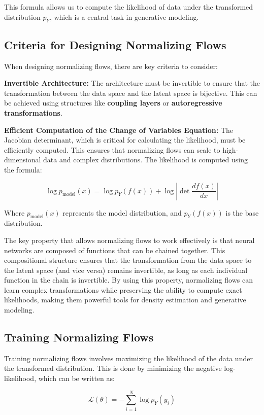 \documentclass{article}
\begin{document}
This formula allows us to compute the likelihood of data under the transformed distribution \( p_Y \), which is a central task in generative modeling.

\subsection{Criteria for Designing Normalizing Flows}
When designing normalizing flows, there are key criteria to consider:


\textbf{Invertible Architecture:} The architecture must be invertible to ensure that the transformation between the data space and the latent space is bijective. This can be achieved using structures like \textbf{coupling layers} or \textbf{autoregressive transformations}.

\textbf{Efficient Computation of the Change of Variables Equation:} The Jacobian determinant, which is critical for calculating the likelihood, must be efficiently computed. This ensures that normalizing flows can scale to high-dimensional data and complex distributions. The likelihood is computed using the formula:

\[
\log p_{\text{model}}(x) = \log p_Y(f(x)) + \log \left| \det \frac{d f(x)}{dx} \right|
\]

Where \( p_{\text{model}}(x) \) represents the model distribution, and \( p_Y(f(x)) \) is the base distribution.

The key property that allows normalizing flows to work effectively is that neural networks are composed of functions that can be chained together. This compositional structure ensures that the transformation from the data space to the latent space (and vice versa) remains invertible, as long as each individual function in the chain is invertible. By using this property, normalizing flows can learn complex transformations while preserving the ability to compute exact likelihoods, making them powerful tools for density estimation and generative modeling.

\subsection{Training Normalizing Flows}
Training normalizing flows involves maximizing the likelihood of the data under the transformed distribution. This is done by minimizing the negative log-likelihood, which can be written as:

\[
\mathcal{L}(\theta) = -\sum_{i=1}^N \log p_Y(y_i)
\]
\end{document}
